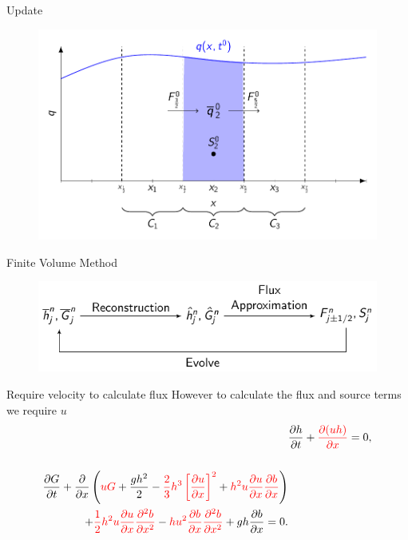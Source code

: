 \documentclass[pdf]{beamer}
\begin{document}
\begin{frame}{Update}
	\begin{figure}
		\includegraphics[width=\textwidth]{./Pics/Tex/FVM/TotalFluxInOutSource.pdf}
	\end{figure}
\end{frame}

\begin{frame}{Finite Volume Method}
	\begin{figure}
		\includegraphics[width=\textwidth]{./Pics/Tex/FlowCharts/FVM.pdf}
	\end{figure}
\end{frame}

\begin{frame}{Require velocity to calculate flux}
	However to calculate the flux and source terms we require $u$
	\pause	
	\begin{align*}
	& \frac{\partial h}{\partial t} + {\color{red}\dfrac{\partial (uh)}{\partial x}} = 0,  \\ \nonumber \\
	\begin{split}
	\frac{\partial G}{\partial t}  + \frac{\partial}{\partial x} \left( {\color{red}uG} + \frac{gh^2}{2} - {\color{red}\frac{2}{3}h^3 \left[\frac{\partial {u}}{\partial x}\right]^2} + {\color{red}h^2 {u}\frac{\partial {u}}{\partial x}\frac{\partial b}{\partial x} }\right) \\ + {\color{red}\frac{1}{2}h^2 {u} \frac{\partial {u}}{\partial x} \frac{\partial^2 b}{\partial x^2} } -  {\color{red} h {u}^2\frac{\partial b}{\partial x}\frac{\partial^2 b}{\partial x^2}} + gh\frac{\partial b}{\partial x} = 0 .
	\end{split}
	\end{align*}
\end{frame}
\end{document}
